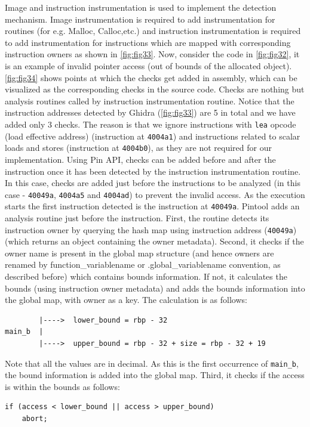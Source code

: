 Image and instruction instrumentation is used to implement the detection mechanism. Image instrumentation is required to add instrumentation for routines (for e.g. Malloc, Calloc,etc.) and instruction instrumentation is required to add instrumentation for instructions which are mapped with corresponding instruction owners as shown in \cref{fig:fig33}. Now, consider the code in \cref{fig:fig32}, it is an example of invalid pointer access (out of bounds of the allocated object). \cref{fig:fig34} shows points at which the checks get added in assembly, which can be visualized as the corresponding checks in the source code. Checks are nothing but analysis routines called by instruction instrumentation routine. Notice that the instruction addresses detected by Ghidra (\cref{fig:fig33}) are 5 in total and we have added only 3 checks. The reason is that we ignore instructions with \texttt{lea} opcode (load effective address) (instruction at \texttt{4004a1}) and instructions related to scalar loads and stores (instruction at \texttt{4004b0}), as they are not required for our implementation. Using Pin API, checks can be added before and after the instruction once it has been detected by the instruction instrumentation routine. In this case, checks are added just before the instructions to be analyzed (in this case - \texttt{40049a}, \texttt{4004a5} and \texttt{4004ad}) to prevent the invalid access. As the execution starts the first instruction detected is the instruction at \texttt{40049a}. Pintool adds an analysis routine just before the instruction. First, the routine detects its instruction owner by querying the hash map using instruction address (\texttt{40049a}) (which returns an object containing the owner metadata). Second, it checks if the owner name is present in the global map structure (and hence owners are renamed by function\_variablename or .global\_variablename convention, as described before) which contains bounds information. If not, it calculates the bounds (using instruction owner metadata) and adds the bounds information into the global map, with owner as a key. The calculation is as follows:
\begin{lstlisting}
        |---->  lower_bound = rbp - 32
main_b  |
        |---->  upper_bound = rbp - 32 + size = rbp - 32 + 19
\end{lstlisting}
Note that all the values are in decimal. As this is the first occurrence of \texttt{main\_b}, the bound information is added into the global map. Third, it checks if the access is within the bounds as follows:
\begin{lstlisting}
if (access < lower_bound || access > upper_bound)
    abort;
\end{lstlisting}
